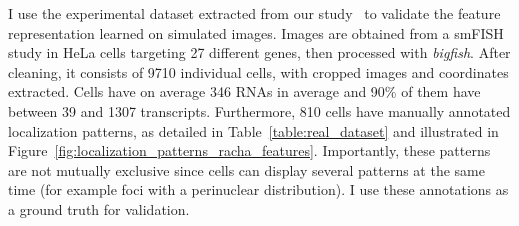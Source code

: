 I use the experimental dataset extracted from our study~\cite{CHOUAIB_2020} to validate the feature representation learned on simulated images.
Images are obtained from a \ac{smFISH} study in HeLa cells targeting 27 different genes, then processed with \emph{bigfish}.
After cleaning, it consists of 9710 individual cells, with cropped images and coordinates extracted.
Cells have on average 346 \ac{RNA}s in average and 90\% of them have between 39 and 1307 transcripts.
Furthermore, 810 cells have manually annotated localization patterns, as detailed in Table~\ref{table:real_dataset} and illustrated in Figure~\ref{fig:localization_patterns_racha_features}.
Importantly, these patterns are not mutually exclusive since cells can display several patterns at the same time (for example foci with a perinuclear distribution).
I use these annotations as a ground truth for validation.

